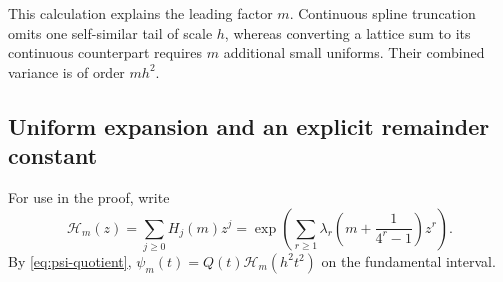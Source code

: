 \documentclass[11pt,a4paper]{article}
\numberwithin{equation}{section}
\theoremstyle{definition}
\begin{document}
This calculation explains the leading factor $m$. Continuous spline
truncation omits one self-similar tail of scale $h$, whereas converting
a lattice sum to its continuous counterpart requires $m$ additional
small uniforms. Their combined variance is of order $mh^2$.

\subsection{Uniform expansion and an explicit remainder constant}

For use in the proof, write
\begin{equation}
 \mathcal H_m(z)=\sum_{j\geq0}H_j(m)z^j
 =\exp\left(\sum_{r\geq1}\lambda_r
               \left(m+\frac1{4^r-1}\right)z^r\right).
\end{equation}
By \eqref{eq:psi-quotient},
$\psi_m(t)=Q(t)\mathcal H_m(h^2t^2)$ on the fundamental interval.
\end{document}
